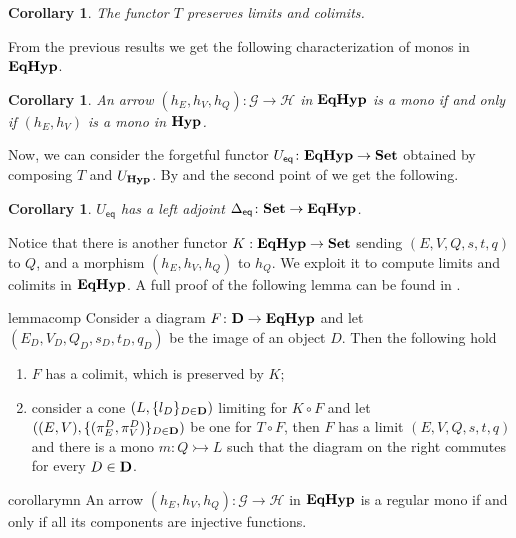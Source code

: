 \documentclass[a4paper,UKenglish,cleveref,pdftex,amsthm,thm-restate,numberwithinsect]{cas-sc}
\theoremstyle{plain}
\newtheorem{corollary}[theorem]{Corollary}
\theoremstyle{definition}
\newcommand{\eq}{\mathsf{eq}}
\newcommand{\Set}{\mathbf{Set}}
\def\D{\textbf {\textup{D}}}
\newcommand{\catname}[1]{\textbf{\textup{#1}}}
\newcommand{\hyp}{\catname{Hyp}}
\newcommand{\EqHyp}{\catname{EqHyp}} %
\newcommand{\mto}{\rightarrowtail}
\begin{document}
\begin{corollary}\label{cor:limcolim}
	The functor $T$ preserves limits and colimits.
\end{corollary}

From the previous results we get the following characterization of monos in $\EqHyp$.

\begin{corollary}\label{cor:mono1}
	An arrow $(h_E, h_V, h_Q): \mathcal{G \to H}$ in $\EqHyp$ is a mono if and only if $(h_E, h_V)$ is a mono in $\hyp$.
\end{corollary}

Now, we can consider the forgetful functor $U_{\eq}\colon \EqHyp\to \Set$ obtained by composing $T$ and $U_{\hyp}$.  By  and the second point of  we get the following.

\begin{corollary}\label{cor:ladj}
	$U_{\eq}$ has a left adjoint $\Delta_{\eq}\colon \Set \to \EqHyp$.
\end{corollary}

Notice that there is another functor $K: \EqHyp \to \Set$ sending $(E, V, Q, s, t, q)$ to $Q$, and a morphism $(h_E, h_V, h_Q)$ to $h_Q$. We  exploit it to compute limits and colimits in $\EqHyp$. A full proof of the following lemma can be found in .

\noindent
\parbox{11.4cm}{
\begin{restatable}{lemma}{comp}\label{prop:eqhyp_complete}
Consider a diagram $F\colon \D \to \EqHyp$ and let $(E_D, V_D, Q_D, s_D, t_D, q_D)$ be the image of an object $D$. Then the following hold
\begin{enumerate}
		\item $F$ has a colimit, which is preserved by $K$;
	\item consider a cone $(L, \{l_D\}_{D\in \D})$ limiting  for $K \circ F$ and let $((E, V), \{(\pi^D_E, \pi^D_V)\}_{D\in \D})$ be one for $T\circ F$, then $F$ has a limit $(E, V, Q, s, t, q)$ and there is a mono $m\colon Q\mto L$ such that the diagram on the right commutes for every $D\in \D$.
\end{enumerate}
\end{restatable}}\hfill 
\parbox{3cm}{}   

\begin{restatable}{corollary}{mn}\label{cor:mono2}
	An arrow $(h_E, h_V, h_Q): \mathcal{G\to H}$ in $\EqHyp$ is a regular mono if and only if all its components are injective functions.
\end{restatable}
\end{document}
